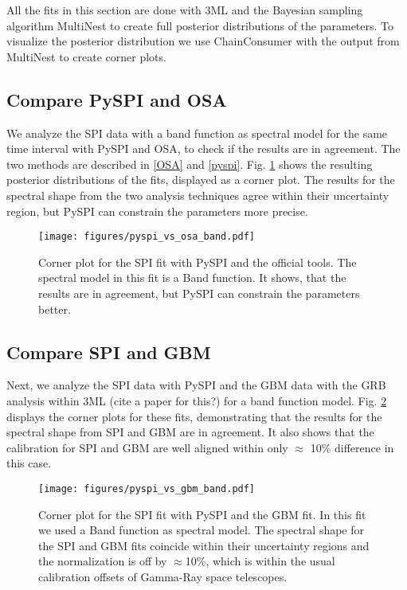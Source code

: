 \documentclass[twocolumn]{aa}
\begin{document}
All the fits in this section are done with 3ML \citep{3ML} and the Bayesian sampling algorithm MultiNest \citep{multinest} to create full posterior distributions of the parameters. To visualize the posterior distribution we use ChainConsumer \citep{chainconsumer} with the output from MultiNest to create corner plots.

\subsection{Compare PySPI and OSA}

We analyze the SPI data with a band function as spectral model for the same time interval with PySPI and OSA, to check if the results are in agreement. The two methods are described in \ref{OSA} and \ref{pyspi}. Fig. \ref{fig:corner_osa_pyspi_band} shows the resulting posterior distributions of the fits, displayed as a corner plot. The results for the spectral shape from the two analysis techniques agree within their uncertainty region, but PySPI can constrain the parameters more precise.

\begin{figure}
  \begin{centering}
    \texttt{[image: figures/pyspi\_vs\_osa\_band.pdf]}
    \caption{Corner plot for the SPI fit with PySPI and the official tools. The spectral model in this fit is a Band function. It shows, that the results are in agreement, but PySPI can constrain the parameters better.}
    \label{fig:corner_osa_pyspi_band}
  \end{centering}
\end{figure}


\subsection{Compare SPI and GBM}

Next, we analyze the SPI data with PySPI and the GBM data with the GRB analysis within 3ML (cite a paper for this?) for a band function model. Fig. \ref{fig:corner_gbm_pyspi_band} displays the corner plots for these fits, demonstrating that the results for the spectral shape from SPI and GBM are in agreement. It also shows that the calibration for SPI and GBM are well aligned within only $\approx$ 10\% difference in this case.

\begin{figure}
  \begin{centering}
    \texttt{[image: figures/pyspi\_vs\_gbm\_band.pdf]}
    \caption{Corner plot for the SPI fit with PySPI and the GBM fit. In this fit we used a Band function as spectral model. The spectral shape for the SPI and GBM fits coincide within their uncertainty regions and the normalization is off by $\approx$10\%, which is within the usual calibration offsets of Gamma-Ray space telescopes.}
    \label{fig:corner_gbm_pyspi_band}
  \end{centering}
\end{figure}
\end{document}
